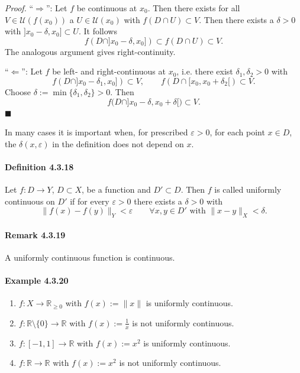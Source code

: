 \documentclass[12pt]{article}
\begin{document}
\emph{Proof.} “$\Rightarrow$”: 
Let $f$ be continuous at $x_0$. Then there exists for all $V \in \mathcal U(f(x_0))$ a $U \in \mathcal U(x_0)$ with $f(D \cap U) \subset V$. Then there exists a $\delta > 0$ with $]x_0 - \delta, x_0] \subset U$. It follows
\[
	f(D \cap ]x_0 - \delta, x_0]) \subset f(D \cap U) \subset V.
\]
The analogous argument gives right-continuity.

“$\Leftarrow$”: 
Let $f$ be left- and right-continuous at $x_0$, i.e. there exist $\delta_1, \delta_2 > 0$ with
\[
	f(D \cap ]x_0 - \delta_1, x_0]) \subset V, \qquad f(D \cap [x_0, x_0 + \delta_2[) \subset V.
\]
Choose $\delta := \min\{\delta_1, \delta_2\} > 0$. Then
\[
	f\bigl(D \cap ]x_0 - \delta, x_0 + \delta[\bigr) \subset V.
\]
\hfill $\blacksquare$

In many cases it is important when, for prescribed $\varepsilon > 0$, for each point $x \in D$, the $\delta(x,\varepsilon)$ in the definition does not depend on $x$.

\paragraph{Definition 4.3.18} Let $f : D \to Y$, $D \subset X$, be a function and $D' \subset D$. Then $f$ is called uniformly continuous on $D'$ if for every $\varepsilon > 0$ there exists a $\delta > 0$ with
\[
	\|f(x) - f(y)\|_Y < \varepsilon \qquad \forall x, y \in D' \text{ with } \|x - y\|_X < \delta.
\]

\paragraph{Remark 4.3.19} A uniformly continuous function is continuous.

\paragraph{Example 4.3.20}
\begin{enumerate}[label=({\arabic*})]
	\item $f : X \to \mathbb R_{\ge 0}$ with $f(x) := \|x\|$ is uniformly continuous.
	\item $f : \mathbb R \setminus \{0\} \to \mathbb R$ with $f(x) := \frac{1}{x}$ is not uniformly continuous.
	\item $f : [-1,1] \to \mathbb R$ with $f(x) := x^2$ is uniformly continuous.
    \item $f : \mathbb R \to \mathbb R$ with $f(x) := x^2$ is not uniformly continuous.
\end{enumerate}
\end{document}
